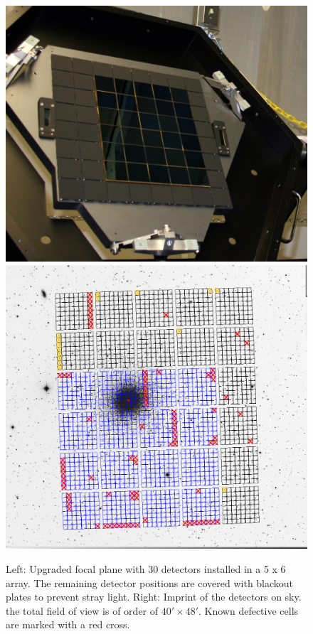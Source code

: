 \documentclass[]{spieman}
\begin{document}
\begin{figure}
	\centering
	\hfill
	\includegraphics[height=0.4\textwidth]{images/detectorsOnFocalPlane5x6.jpg}
	\hfill
	\includegraphics[height=0.4\textwidth]{images/5ODI_Imprint.png}
	\hfill \\[1ex]
	
	\caption{\label{fig_focalplane} Left: Upgraded focal plane with 30 
	detectors installed in a 5 x 6 array. The remaining detector positions are 
	covered with blackout plates to prevent stray light. Right: Imprint of the 
	detectors on sky. the total field of view is of order of $40'\times 48'$. 
	Known defective cells are marked with a red cross. }
\end{figure}
\end{document}
